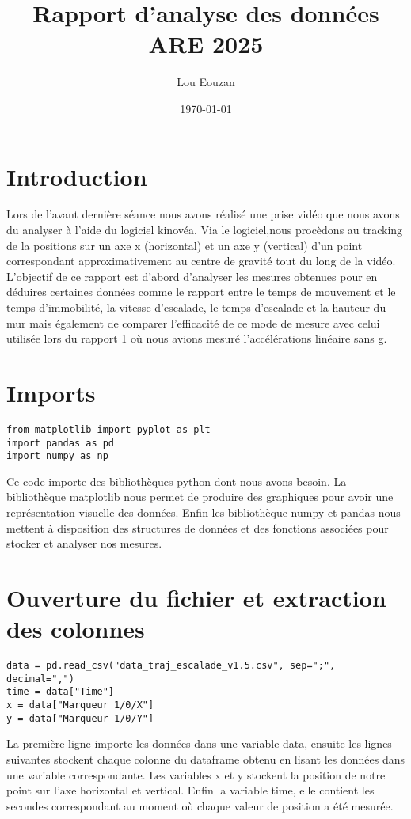 \documentclass[11pt]{article}
\author{Lou Eouzan}
\date{\today}
\title{Rapport d'analyse des données ARE 2025}
\begin{document}
\maketitle
\tableofcontents

\section{Introduction}
\label{sec:org6cf5ec0}

Lors de l'avant dernière séance nous avons réalisé une prise vidéo que nous avons du analyser à l'aide du logiciel kinovéa. Via le logiciel,nous
procèdons au tracking de la positions sur un axe x (horizontal) et un axe y (vertical) d'un point correspondant approximativement au centre de gravité
tout du long de la vidéo. L'objectif de ce rapport est d'abord d'analyser les mesures obtenues pour en déduires certaines données comme le rapport
entre le temps de mouvement et le temps d’immobilité, la vitesse d'escalade, le temps d'escalade et la hauteur du mur mais également de comparer
l'efficacité de ce mode de mesure avec celui utilisée lors du rapport 1 où nous avions mesuré l'accélérations linéaire sans g.
\section{Imports}
\label{sec:org13cef56}

\begin{verbatim}
from matplotlib import pyplot as plt
import pandas as pd
import numpy as np
\end{verbatim}

Ce code importe des bibliothèques python dont nous avons besoin. La bibliothèque matplotlib nous permet de produire des graphiques pour avoir une
représentation visuelle des données. Enfin les bibliothèque numpy et pandas nous mettent à disposition des structures de données et des fonctions
associées pour stocker et analyser nos mesures.
\section{Ouverture du fichier et extraction des colonnes}
\label{sec:orgbbcdf20}

\begin{verbatim}
data = pd.read_csv("data_traj_escalade_v1.5.csv", sep=";", decimal=",")
time = data["Time"]
x = data["Marqueur 1/0/X"]
y = data["Marqueur 1/0/Y"]
\end{verbatim}

La première ligne importe les données dans une variable data, ensuite les lignes suivantes stockent chaque colonne du dataframe obtenu en lisant les
données dans une variable correspondante. Les variables x et y stockent la position de notre point sur l'axe horizontal et vertical. Enfin la variable
time, elle contient les secondes correspondant au moment où chaque valeur de position a été mesurée.
\end{document}
